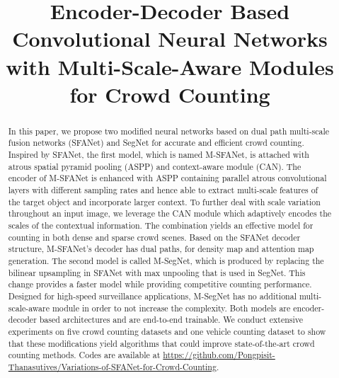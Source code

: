 \documentclass[10pt, conference, a4paper]{IEEEtran}
\begin{document}
\title{Encoder-Decoder Based Convolutional Neural Networks with Multi-Scale-Aware Modules for Crowd Counting}

\author{

\and


\and

}

\maketitle

\begin{abstract}
In this paper, we propose two modified neural networks based on dual path multi-scale fusion networks (SFANet) and SegNet for accurate and efficient crowd counting. Inspired by SFANet, the first model, which is named M-SFANet, is attached with atrous spatial pyramid pooling (ASPP) and context-aware module (CAN). The encoder of M-SFANet is enhanced with ASPP containing parallel atrous convolutional layers with different sampling rates and hence able to extract multi-scale features of the target object and incorporate larger context. To further deal with scale variation throughout an input image, we leverage the CAN module which adaptively encodes the scales of the contextual information. The combination yields an effective model for counting in both dense and sparse crowd scenes. Based on the SFANet decoder structure, M-SFANet's decoder has dual paths, for density map and attention map generation. The second model is called M-SegNet, which is produced by replacing the bilinear upsampling in SFANet with max unpooling that is used in SegNet. This change provides a faster model while providing competitive counting performance. Designed for high-speed surveillance applications, M-SegNet has no additional multi-scale-aware module in order to not increase the complexity. Both models are encoder-decoder based architectures and are end-to-end trainable. We conduct extensive experiments on five crowd counting datasets and one vehicle counting dataset to show that these modifications yield algorithms that could improve state-of-the-art crowd counting methods. Codes are available at \url{https://github.com/Pongpisit-Thanasutives/Variations-of-SFANet-for-Crowd-Counting}.
\end{abstract}
\end{document}
